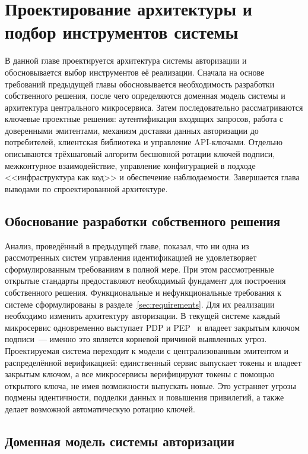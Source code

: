 \chapter{Проектирование архитектуры и подбор инструментов системы}\label{ch:design}

В данной главе проектируется архитектура системы авторизации
и обосновывается выбор инструментов её реализации.
Сначала на основе требований предыдущей главы обосновывается
необходимость разработки собственного решения,
после чего определяются доменная модель системы
и архитектура центрального микросервиса.
Затем последовательно рассматриваются ключевые проектные решения:
аутентификация входящих запросов, работа с доверенными эмитентами,
механизм доставки данных авторизации до потребителей,
клиентская библиотека и управление API-ключами.
Отдельно описываются трёхшаговый алгоритм бесшовной ротации
ключей подписи, межконтурное взаимодействие, управление конфигурацией
в подходе <<инфраструктура как код>> и обеспечение наблюдаемости.
Завершается глава выводами по спроектированной архитектуре.

\section{Обоснование разработки собственного решения}\label{sec:own-solution}

Анализ, проведённый в предыдущей главе, показал,
что ни одна из рассмотренных систем управления идентификацией
не удовлетворяет сформулированным требованиям в полной мере.
При этом рассмотренные открытые стандарты
предоставляют необходимый фундамент для построения собственного решения.
Функциональные и нефункциональные требования к системе сформулированы
в разделе~\ref{sec:requirements}.
Для их реализации необходимо изменить архитектуру авторизации.
В текущей системе каждый микросервис одновременно
выступает PDP и PEP~\cite{AWSPDP}
и владеет закрытым ключом подписи~---
именно это является корневой причиной выявленных угроз.
Проектируемая система переходит к модели
с централизованным эмитентом и распределённой верификацией:
единственный сервис выпускает токены и владеет закрытым ключом,
а все микросервисы верифицируют токены с помощью открытого ключа,
не имея возможности выпускать новые.
Это устраняет угрозы подмены идентичности, подделки данных
и повышения привилегий,
а также делает возможной автоматическую ротацию ключей.

\section{Доменная модель системы авторизации}\label{sec:domain-model}

